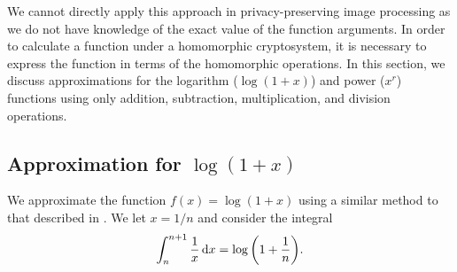 We cannot directly apply this approach in privacy-preserving image processing as we do not have knowledge of the exact value of the function arguments. In order to calculate a function under a  homomorphic cryptosystem, it is necessary to express the function in terms of the homomorphic operations.
In this section, we discuss approximations for the logarithm ($\log(1+x)$) and power ($x^r$) functions using only addition, subtraction, multiplication, and division operations.

\subsection{Approximation for $\log(1+x)$}
\label{sec:logapproximation}
We approximate the function $f(x)=\log(1+x)$ using a similar method to that described in
\cite{khattri_new_2009}.
We let $x = 1/n$ and consider the integral
\begin{align*}
  \int_{n}^{n+1}{\frac{1}{x}\mathop{}\!\mathrm{d} x}=\log{\left(1+\frac{1}{n}\right)}.
\end{align*}


